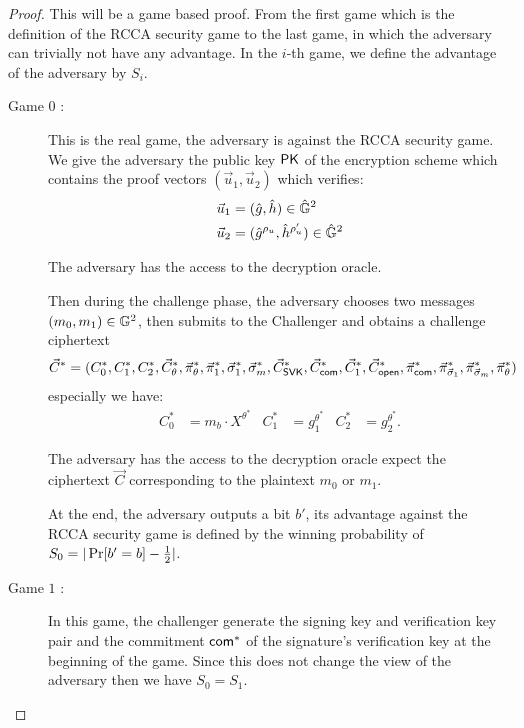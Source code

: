\begin{proof}

  This will be a game based proof. From the first game which is the definition of the RCCA security game to the last game, in which the adversary can trivially not have any advantage. In the $i$-th game, we define the advantage of the adversary by $S_i$.

  \begin{description}
  \item[\textsf{Game} $0$ :] This is the real game, the adversary is against the RCCA security game. We give the adversary the public key $\mathsf{PK}$ of the encryption scheme which contains the proof vectors $(\vec{u}_1, \vec{u}_2)$ which verifies:
    \begin{align*}
      \vec{u}_1 &= (\hat{g}, \hat{h}) \in \hat{\mathbb{G}}^2\\
      \vec{u}_2 &= (\hat{g}^{\rho_u}, \hat{h}^{\rho_u'}) \in \hat{\mathbb{G}}^2
    \end{align*}

    The adversary has the access to the decryption oracle.
    
    Then during the challenge phase, the adversary chooses two messages $(m_0, m_1) \in \mathbb{G}^2$, then submits to the Challenger and obtains a challenge ciphertext
    \begin{align*}
      \vec{C}^* = (C_0^*, C_1^*, C_2^*, \vec{C}_{\theta}^*, \vec{\pi}_{\theta}^*, \vec{\pi}_{1}^*, \vec{\sigma}_1^*, \vec{\sigma}_m^*, \vec{C}_{\mathsf{SVK}}^*, \vec{C}_{\mathsf{com}}^*, \vec{C}_1^*, \vec{C}_{\mathsf{open}}^*, \vec{\pi}_{\mathsf{com}}^*, \vec{\pi}_{\vec{\sigma}_1}^*, \vec{\pi}_{\vec{\sigma}_m}^*, \vec{\pi}_{\theta}^*)
    \end{align*}
    especially we have:
    \begin{align*}
      C_0^* &= m_b \cdot X^{\theta^*} & C_1^* &= g_1^{\theta^*} & C_2^* &= g_2^{\theta^*}.
    \end{align*}

    The adversary has the access to the decryption oracle expect the ciphertext $\vec{C}$ corresponding to the plaintext $m_0$ or $m_1$.

    At the end, the adversary outputs a bit $b'$, its advantage against the RCCA security game is defined by the winning probability of $S_0 = |\operatorname{Pr}[b' = b] - \frac{1}{2}|$.

  \item[\textsf{Game} $1$ :] In this game, the challenger generate the signing key and verification key pair and the commitment $\mathsf{com}^*$ of the signature's verification key at the beginning of the game. Since this does not change the view of the adversary then we have $S_0 = S_1$.


\end{description}
\end{proof}

